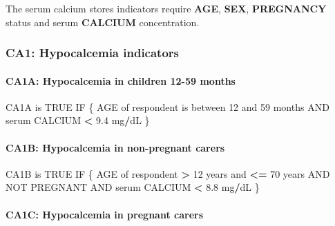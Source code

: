 \documentclass[12pt,a4paper]{article}
\newenvironment{Shaded}{\begin{snugshade}}{\end{snugshade}}
\newcommand{\DecValTok}[1]{\textcolor[rgb]{0.00,0.00,0.81}{#1}}
\newcommand{\FloatTok}[1]{\textcolor[rgb]{0.00,0.00,0.81}{#1}}
\newcommand{\NormalTok}[1]{#1}
\newcommand{\OperatorTok}[1]{\textcolor[rgb]{0.81,0.36,0.00}{\textbf{#1}}}
\newcommand{\OtherTok}[1]{\textcolor[rgb]{0.56,0.35,0.01}{#1}}
\newcommand{\StringTok}[1]{\textcolor[rgb]{0.31,0.60,0.02}{#1}}
\let\oldparagraph\paragraph
\renewcommand{\paragraph}[1]{\oldparagraph{#1}\mbox{}}
\begin{document}
The serum calcium stores indicators require \textbf{AGE}, \textbf{SEX}, \textbf{PREGNANCY} status and serum \textbf{CALCIUM} concentration.

\newpage

\hypertarget{ca1-hypocalcemia-indicators}{%
\subsubsection{CA1: Hypocalcemia indicators}\label{ca1-hypocalcemia-indicators}}

\hypertarget{ca1a-hypocalcemia-in-children-12-59-months}{%
\paragraph{CA1A: Hypocalcemia in children 12-59 months}\label{ca1a-hypocalcemia-in-children-12-59-months}}

\begin{Shaded}
\begin{Highlighting}[]
\NormalTok{CA1A is }\OtherTok{TRUE}\NormalTok{ IF}
\NormalTok{  \{}
\NormalTok{    AGE of respondent is between }\DecValTok{12}\NormalTok{ and }\DecValTok{59}\NormalTok{ months AND }
\NormalTok{      serum CALCIUM }\OperatorTok{<}\StringTok{ }\FloatTok{9.4}\NormalTok{ mg}\OperatorTok{/}\NormalTok{dL}
\NormalTok{  \}}
\end{Highlighting}
\end{Shaded}

\hypertarget{ca1b-hypocalcemia-in-non-pregnant-carers}{%
\paragraph{CA1B: Hypocalcemia in non-pregnant carers}\label{ca1b-hypocalcemia-in-non-pregnant-carers}}

\begin{Shaded}
\begin{Highlighting}[]
\NormalTok{CA1B is }\OtherTok{TRUE}\NormalTok{ IF}
\NormalTok{  \{}
\NormalTok{    AGE of respondent }\OperatorTok{>}\StringTok{ }\DecValTok{12}\NormalTok{ years and }\OperatorTok{<=}\StringTok{ }\DecValTok{70}\NormalTok{ years AND}
\NormalTok{      NOT PREGNANT AND serum CALCIUM }\OperatorTok{<}\StringTok{ }\FloatTok{8.8}\NormalTok{ mg}\OperatorTok{/}\NormalTok{dL}
\NormalTok{  \}}
\end{Highlighting}
\end{Shaded}

\hypertarget{ca1c-hypocalcemia-in-pregnant-carers}{%
\paragraph{CA1C: Hypocalcemia in pregnant carers}\label{ca1c-hypocalcemia-in-pregnant-carers}}
\end{document}
